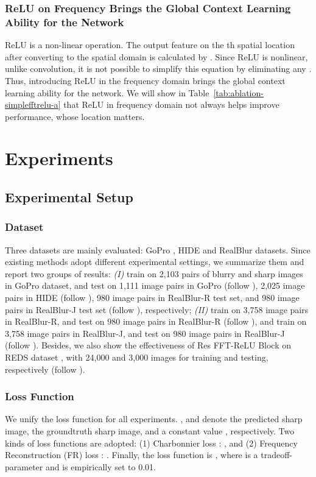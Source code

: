 \documentclass[letterpaper]{article} \usepackage{aaai23}  \usepackage{times}  \usepackage{helvet}  \usepackage{courier}  \usepackage[hyphens]{url}  \usepackage{graphicx} \usepackage{enumitem}
\begin{document}
\subsubsection{ReLU on Frequency Brings the Global Context Learning Ability for the Network}
ReLU is a non-linear operation. The output feature on the th spatial location after converting to the spatial domain is calculated by
.
Since ReLU is nonlinear, unlike convolution, it is not possible to simplify this equation by eliminating any . Thus, introducing ReLU in the frequency domain brings the global context learning ability for the network. We will show in Table~\ref{tab:ablation-simplefftrelu-a} that ReLU in frequency domain not always helps improve performance, whose location matters.

\section{Experiments}

\subsection{Experimental Setup}
\label{sec:dataset-detail}
\subsubsection{Dataset} Three datasets are mainly evaluated: GoPro \cite{Nah2017deep}, HIDE \cite{Shen2019human} and RealBlur \cite{Rim2020real} datasets. Since existing methods adopt different experimental settings, we summarize them and report two groups of results: \textit{({I})} train on 2,103 pairs of blurry and sharp images in GoPro dataset, and test on 1,111 image pairs in GoPro (follow \cite{Cho2021rethinking}), 2,025 image pairs in HIDE (follow \cite{Zamir2021multi}), 980 image pairs in RealBlur-R test set, and 980 image pairs in RealBlur-J test set (follow \cite{Zamir2021multi}), respectively; \textit{(II)} train on 3,758 image pairs in RealBlur-R, and test on 980 image pairs in RealBlur-R (follow \cite{Zamir2021multi}), and train on 3,758 image pairs in RealBlur-J, and test on 980 image pairs in RealBlur-J (follow \cite{Zamir2021multi}). Besides, we also show the effectiveness of Res FFT-ReLU Block on REDS dataset \cite{Nah2021ntire}, with 24,000 and 3,000 images for training and testing, respectively (follow \cite{Tu2022maxim}).

\subsubsection{Loss Function} We unify the loss function for all experiments. ,  and  denote the predicted sharp image, the groundtruth sharp image, and a constant value , respectively. Two kinds of loss functions are adopted: (1) {C}harbonnier loss \cite{Zamir2021multi}:
, and (2) {F}requency {R}econstruction (FR) loss \cite{Cho2021rethinking,Tu2022maxim}: . Finally, the loss function is , where  is a tradeoff-parameter and is empirically set to 0.01.
\end{document}
